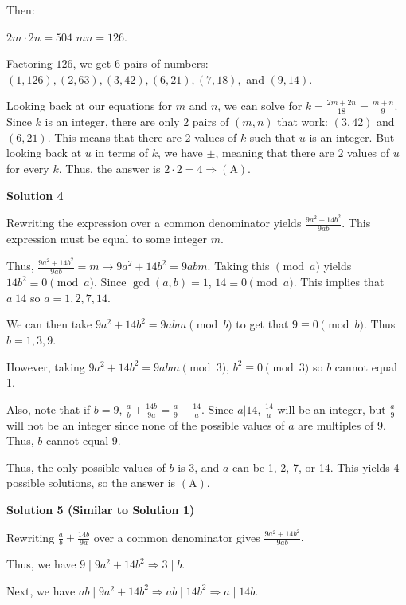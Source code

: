 \begin{enumerate}
 Then:

 $2m \cdot 2n = 504$
$mn = 126$.

 Factoring $126$, we get $6$ pairs of numbers: $(1,126), (2,63), (3,42), (6,21), (7,18),$ and $(9,14)$.

 Looking back at our equations for $m$ and $n$, we can solve for $k = \frac{2m + 2n}{18} = \frac{m+n}{9}$. Since $k$ is an integer, there are only $2$ pairs of $(m,n)$ that work: $(3,42)$ and $(6,21)$. This means that there are $2$ values of $k$ such that $u$ is an integer. But looking back at $u$ in terms of $k$, we have $\pm$, meaning that there are $2$ values of $u$ for every $k$. Thus, the answer is $2 \cdot 2 = 4 \Rightarrow \mathrm{(A)}$.

 



\textbf{Solution 4}

Rewriting the expression over a common denominator yields $\frac{9a^2 + 14b^2}{9ab}$. This expression must be equal to some integer $m$.

 Thus, $\frac{9a^2 + 14b^2}{9ab} = m \rightarrow 9a^2 + 14b^2 = 9abm$. Taking this $\pmod{a}$ yields $14b^2 \equiv 0\pmod{a}$. Since $\gcd(a,b)=1$, $14 \equiv 0\pmod{a}$. This implies that $a|14$ so $a = 1, 2, 7, 14$.

 We can then take $9a^2 + 14b^2 = 9abm \pmod{b}$ to get that $9 \equiv 0 \pmod{b}$. Thus $b = 1, 3, 9$.

 However, taking $9a^2 + 14b^2 = 9abm \pmod{3}$, $b^2 \equiv 0\pmod{3}$ so $b$ cannot equal 1.

 Also, note that if $b = 9$,  $\frac{a}{b}+\frac{14b}{9a} = \frac{a}{9}+\frac{14}{a}$. Since $a|14$, $\frac{14}{a}$ will be an integer, but $\frac{a}{9}$ will not be an integer since none of the possible values of $a$ are multiples of 9. Thus, $b$ cannot equal 9.

 Thus, the only possible values of $b$ is 3, and $a$ can be 1, 2, 7, or 14. This yields 4 possible solutions, so the answer is $\mathrm{(A)}$.

 



\textbf{Solution 5 (Similar to Solution 1)}

Rewriting $\frac{a}{b} + \frac{14b}{9a}$ over a common denominator gives $\frac{9a^2 + 14b^2}{9ab}.$

 Thus, we have $9 \mid 9a^2 + 14b^2 \Rightarrow  3 \mid b.$

 Next, we have $ab \mid 9a^2+14b^2 \Rightarrow  ab \mid 14b^2 \Rightarrow a \mid 14b.$


\end{enumerate}
